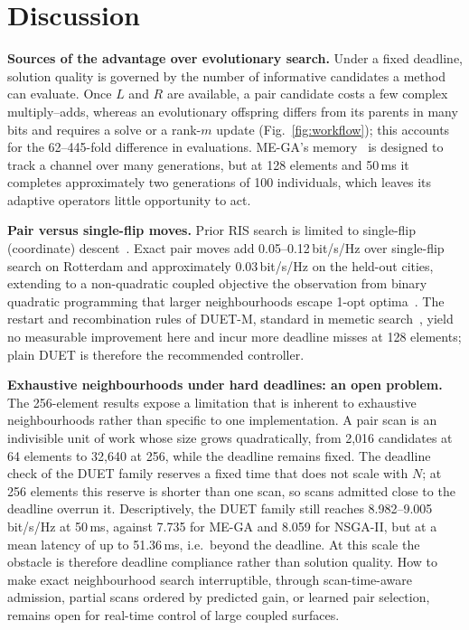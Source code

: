 \documentclass[runningheads]{llncs}
\newcommand{\duet}{\mbox{DUET}}\newcommand{\duetD}{\mbox{DUET-D}}\newcommand{\duetE}{\mbox{DUET-E}}
\newcommand{\bts}{\mbox{DUET-M}}
\begin{document}
\section{Discussion}\label{sec:discussion}
\textbf{Sources of the advantage over evolutionary search.} Under a fixed deadline, solution quality is governed by the number of informative candidates a method can evaluate. Once $L$ and $R$ are available, a pair candidate costs a few complex multiply--adds, whereas an evolutionary offspring differs from its parents in many bits and requires a solve or a rank-$m$ update (Fig.~\ref{fig:workflow}); this accounts for the 62--445-fold difference in evaluations. ME-GA's memory~\cite{zardi2024memory} is designed to track a channel over many generations, but at 128 elements and 50\,ms it completes approximately two generations of 100 individuals, which leaves its adaptive operators little opportunity to act.

\textbf{Pair versus single-flip moves.} Prior RIS search is limited to single-flip (coordinate) descent~\cite{hammami2026statistical}. Exact pair moves add 0.05--0.12\,bit/s/Hz over single-flip search on Rotterdam and approximately 0.03\,bit/s/Hz on the held-out cities, extending to a non-quadratic coupled objective the observation from binary quadratic programming that larger neighbourhoods escape 1-opt optima~\cite{merz2002bqp}. The restart and recombination rules of \bts{}, standard in memetic search~\cite{lourenco2010ils,merz2004memetic}, yield no measurable improvement here and incur more deadline misses at 128 elements; plain \duet{} is therefore the recommended controller.

\textbf{Exhaustive neighbourhoods under hard deadlines: an open problem.} The 256-element results expose a limitation that is inherent to exhaustive neighbourhoods rather than specific to one implementation. A pair scan is an indivisible unit of work whose size grows quadratically, from 2,016 candidates at 64 elements to 32,640 at 256, while the deadline remains fixed. The deadline check of the \duet{} family reserves a fixed time that does not scale with $N$; at 256 elements this reserve is shorter than one scan, so scans admitted close to the deadline overrun it. Descriptively, the \duet{} family still reaches 8.982--9.005\,bit/s/Hz at 50\,ms, against 7.735 for ME-GA and 8.059 for NSGA-II, but at a mean latency of up to 51.36\,ms, i.e.\ beyond the deadline. At this scale the obstacle is therefore deadline compliance rather than solution quality. How to make exact neighbourhood search interruptible, through scan-time-aware admission, partial scans ordered by predicted gain, or learned pair selection, remains open for real-time control of large coupled surfaces.
\end{document}
